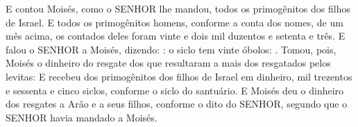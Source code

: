 {  E contou Moisés, como o SENHOR lhe mandou, todos os primogênitos dos filhos de Israel.
  E todos os primogênitos homens, conforme a conta dos nomes, de um mês acima, os contados deles foram vinte e dois mil duzentos e setenta e três. %
  E falou o SENHOR a Moisés, dizendo:
  : o siclo tem vinte óbolos:
  .
  Tomou, pois, Moisés o dinheiro do resgate dos que resultaram a mais dos resgatados pelos levitas:
  E recebeu dos primogênitos dos filhos de Israel em dinheiro, mil trezentos e sessenta e cinco siclos, conforme o siclo do santuário. %
  E Moisés deu o dinheiro dos resgates a Arão e a seus filhos, conforme o dito do SENHOR, segundo que o SENHOR havia mandado a Moisés.
\par }


